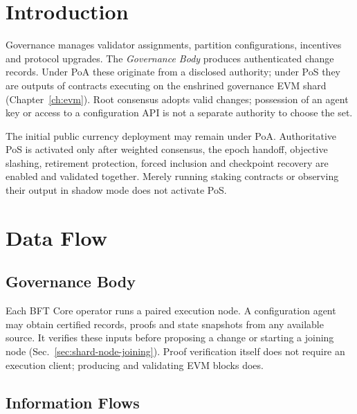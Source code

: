 \chapter{Introduction}

Governance manages validator assignments, partition configurations, incentives and protocol upgrades. The \emph{Governance Body} produces authenticated change records. Under PoA these originate from a disclosed authority; under PoS they are outputs of contracts executing on the enshrined governance EVM shard (Chapter~\ref{ch:evm}). Root consensus adopts valid changes; possession of an agent key or access to a configuration API is not a separate authority to choose the set.

The initial public currency deployment may remain under PoA. Authoritative PoS is activated only after weighted consensus, the epoch handoff, objective slashing, retirement protection, forced inclusion and checkpoint recovery are enabled and validated together. Merely running staking contracts or observing their output in shadow mode does not activate PoS.

\chapter{Data Flow}

\section{Governance Body}

Each BFT Core operator runs a paired execution node. A configuration agent may obtain certified records, proofs and state snapshots from any available source. It verifies these inputs before proposing a change or starting a joining node (Sec.~\ref{sec:shard-node-joining}). Proof verification itself does not require an execution client; producing and validating EVM blocks does.

\section{Information Flows}\label{sec:gov-flows}


